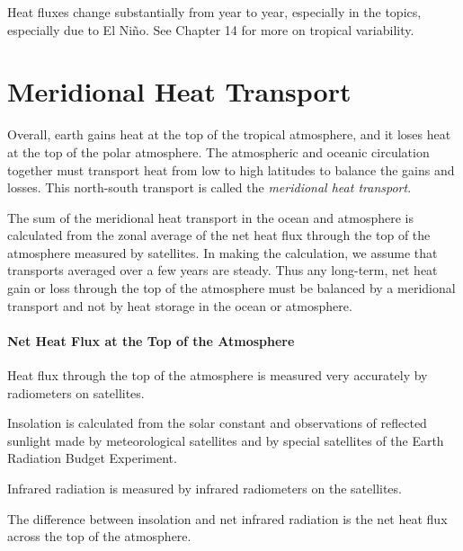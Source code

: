 Heat fluxes change substantially from year to year, especially in the
topics, especially due to El Ni\~{n}o. See Chapter 14 for more on
tropical variability.

\section{Meridional Heat Transport}
 Overall,
earth gains heat at the top of the tropical atmosphere, and it loses
heat at the top of the polar atmosphere. The atmospheric and oceanic
circulation together must transport heat from low to high latitudes to
balance the gains and losses. This north-south transport is called the
\textit{meridional heat transport}.

The sum of the meridional heat transport in the ocean and atmosphere
is calculated from the zonal average of the net heat flux through the top of the
atmosphere measured by satellites. In making the calculation, we
assume that transports averaged over a few years are steady. Thus any
long-term, net heat gain or loss through the top of the atmosphere
must be balanced by a meridional transport and not by heat
storage in the ocean or atmosphere.

\paragraph{Net Heat Flux at the Top of the Atmosphere}
Heat flux through
the top of the atmosphere is measured very accurately by radiometers
on satellites.
\begin{enumerate}

\vitem
Insolation is calculated from the solar constant and observations of reflected sunlight made
by meteorological satellites and by special satellites of the Earth
Radiation Budget Experiment.

\vitem
Infrared radiation is measured by infrared radiometers on the
satellites.

\vitem
The difference between insolation and net infrared radiation is the net heat
flux across the top
of the atmosphere.
\end{enumerate}

